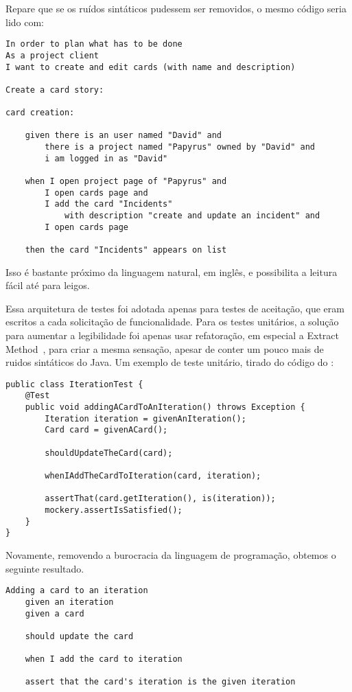 Repare que se os ruídos sintáticos pudessem ser removidos, o mesmo código seria lido com:

\begin{verbatim}
In order to plan what has to be done
As a project client
I want to create and edit cards (with name and description)

Create a card story:

card creation:
	
	given there is an user named "David" and
		there is a project named "Papyrus" owned by "David" and
		i am logged in as "David"

	when I open project page of "Papyrus" and
		I open cards page and
		I add the card "Incidents" 
			with description "create and update an incident" and
		I open cards page
			
	then the card "Incidents" appears on list
\end{verbatim}

Isso é bastante próximo da linguagem natural, em inglês, e possibilita a leitura fácil até para leigos.

Essa arquitetura de testes foi adotada apenas para testes de aceitação, que eram escritos a cada solicitação de funcionalidade. Para os testes unitários, a solução para aumentar a legibilidade foi  apenas usar refatoração, em especial a Extract Method~\cite{refactoring}, para criar a mesma sensação, apesar de conter um pouco mais de ruidos sintáticos do Java. Um exemplo de teste unitário, tirado do código do \calopsita:

\begin{lstlisting}
public class IterationTest {
	@Test
	public void addingACardToAnIteration() throws Exception {
		Iteration iteration = givenAnIteration();
		Card card = givenACard();

		shouldUpdateTheCard(card);

		whenIAddTheCardToIteration(card, iteration);

		assertThat(card.getIteration(), is(iteration));
		mockery.assertIsSatisfied();
	}
}
\end{lstlisting}

Novamente, removendo a burocracia da linguagem de programação, obtemos o seguinte resultado.

\begin{verbatim}
Adding a card to an iteration
	given an iteration
	given a card

	should update the card

	when I add the card to iteration

	assert that the card's iteration is the given iteration
\end{verbatim}

